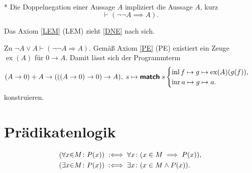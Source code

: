 \begin{Axiom}\label{DNE}\mbox{}\\*
Die Doppelnegation einer Aussage $A$ impliziert die Aussage $A$, kurz
\[\vdash (\neg\neg A\implies A).\]
\end{Axiom}

\begin{Satz} Das Axiom \ref{LEM} (LEM) zieht \ref{DNE} nach sich.
\end{Satz}
\begin{Beweis}
Zu $\neg A \lor A\vdash (\neg\neg A \Rightarrow A)$.
Gemäß Axiom \ref{PE} (PE) existiert ein Zeuge $\operatorname{ex}(A)$
für $0\to A$. Damit lässt sich der Programmterm
\[(A\to 0) + A \to (((A\to 0)\to 0)\to A),\;
s\mapsto\text{{\normalfont\sffamily\bfseries match}}\; s\begin{cases}
\operatorname{inl} f\mapsto g\mapsto \operatorname{ex}(A)(g(f)),\\
\operatorname{inr} a\mapsto g\mapsto a.
\end{cases}\]
konstruieren.\;\qedsymbol
\end{Beweis}

\section{Prädikatenlogik}

\begin{Definition}%
\label{def:bounded}
\begin{align}
(\forall x{\in}M\colon P(x)) &\;:\Longleftrightarrow\; \forall x\colon (x\in M\implies P(x)),\\
(\exists x{\in}M\colon P(x)) &\;:\Longleftrightarrow\; \exists x\colon (x\in M\land P(x)).
\end{align}
\end{Definition}

